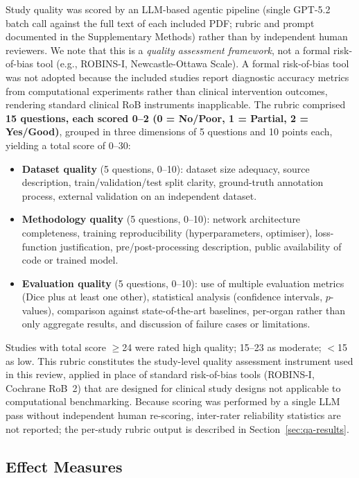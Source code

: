 \documentclass[conference]{IEEEtran}
\begin{document}
Study quality was scored by an LLM-based agentic pipeline (single GPT-5.2 batch call against the full text of each included PDF; rubric and prompt documented in the Supplementary Methods) rather than by independent human reviewers. We note that this is a \emph{quality assessment framework}, not a formal risk-of-bias tool (e.g., ROBINS-I, Newcastle-Ottawa Scale). A formal risk-of-bias tool was not adopted because the included studies report diagnostic accuracy metrics from computational experiments rather than clinical intervention outcomes, rendering standard clinical RoB instruments inapplicable. The rubric comprised \textbf{15 questions, each scored 0--2 (0 = No/Poor, 1 = Partial, 2 = Yes/Good)}, grouped in three dimensions of 5 questions and 10 points each, yielding a total score of 0--30:
\begin{itemize}
    \item \textbf{Dataset quality} (5 questions, 0--10): dataset size adequacy, source description, train/validation/test split clarity, ground-truth annotation process, external validation on an independent dataset.
    \item \textbf{Methodology quality} (5 questions, 0--10): network architecture completeness, training reproducibility (hyperparameters, optimiser), loss-function justification, pre/post-processing description, public availability of code or trained model.
    \item \textbf{Evaluation quality} (5 questions, 0--10): use of multiple evaluation metrics (Dice plus at least one other), statistical analysis (confidence intervals, $p$-values), comparison against state-of-the-art baselines, per-organ rather than only aggregate results, and discussion of failure cases or limitations.
\end{itemize}
Studies with total score $\geq$24 were rated high quality; 15--23 as moderate; $<$15 as low. This rubric constitutes the study-level quality assessment instrument used in this review, applied in place of standard risk-of-bias tools (ROBINS-I, Cochrane RoB~2) that are designed for clinical study designs not applicable to computational benchmarking. Because scoring was performed by a single LLM pass without independent human re-scoring, inter-rater reliability statistics are not reported; the per-study rubric output is described in Section~\ref{sec:qa-results}.

\subsection{Effect Measures}
\end{document}
